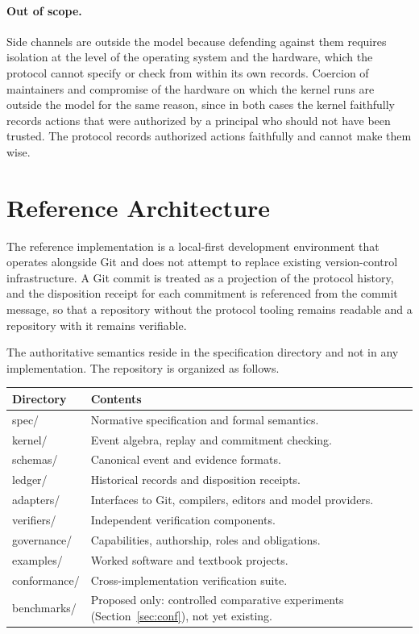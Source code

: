 \documentclass[11pt]{article}
\theoremstyle{remark}
\begin{document}
\paragraph{Out of scope.} Side channels are outside the model because defending against them requires isolation at the level of the operating system and the hardware, which the protocol cannot specify or check from within its own records. Coercion of maintainers and compromise of the hardware on which the kernel runs are outside the model for the same reason, since in both cases the kernel faithfully records actions that were authorized by a principal who should not have been trusted. The protocol records authorized actions faithfully and cannot make them wise.

\section{Reference Architecture}\label{sec:arch}

The reference implementation is a local-first development environment that operates alongside Git and does not attempt to replace existing version-control infrastructure. A Git commit is treated as a projection of the protocol history, and the disposition receipt for each commitment is referenced from the commit message, so that a repository without the protocol tooling remains readable and a repository with it remains verifiable.

The authoritative semantics reside in the specification directory and not in any implementation. The repository is organized as follows.

\begin{center}
\small
\begin{tabular}{@{}>{\ttfamily}l>{\raggedright\arraybackslash}p{}@{}}
\toprule
\normalfont Directory & Contents\\
\midrule
spec/ & Normative specification and formal semantics.\\
kernel/ & Event algebra, replay and commitment checking.\\
schemas/ & Canonical event and evidence formats.\\
ledger/ & Historical records and disposition receipts.\\
adapters/ & Interfaces to Git, compilers, editors and model providers.\\
verifiers/ & Independent verification components.\\
governance/ & Capabilities, authorship, roles and obligations.\\
examples/ & Worked software and textbook projects.\\
conformance/ & Cross-implementation verification suite.\\
benchmarks/ & Proposed only: controlled comparative experiments (Section~\ref{sec:conf}), not yet existing.\\
\bottomrule
\end{tabular}
\end{center}
\end{document}
